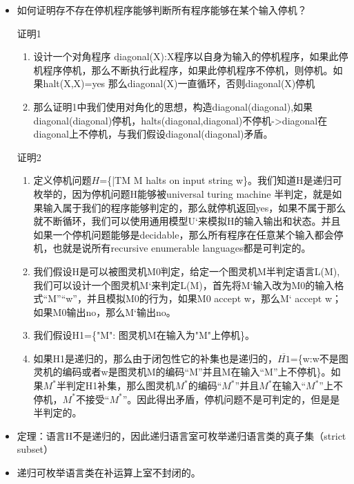 \documentclass[UTF8]{ctexart}
\begin{document}
\begin{itemize}
    \item 如何证明存不存在停机程序能够判断所有程序能够在某个输入停机？
    
    证明1
    \begin{enumerate}
        \item 设计一个对角程序 diagonal(X):X程序以自身为输入的停机程序，如果此停机程序停机，那么不断执行此程序，如果此停机程序不停机，则停机。如果halt(X,X)=yes 那么diagonal(X)一直循环，否则diagonal(X)停机
        \item 那么证明1中我们使用对角化的思想，构造diagonal(diagonal),如果diagonal(diagonal)停机，halts(diagonal,diagonal)不停机->diagonal在diagonal上不停机，与我们假设diagonal(diagonal)矛盾。
    \end{enumerate}

    证明2
    \begin{enumerate}
        \item 定义停机问题$H$=\{<M,w>|TM M halts on input string w\}。我们知道H是递归可枚举的，因为停机问题H能够被universal turing machine 半判定，就是如果输入属于我们的程序能够判定的，那么就停机返回yes，如果不属于那么就不断循环，我们可以使用通用模型U‘来模拟H的输入输出和状态。并且如果一个停机问题能够是decidable，那么所有程序在任意某个输入都会停机，也就是说所有recursive enumerable languages都是可判定的。
        \item 我们假设H是可以被图灵机M0判定，给定一个图灵机M半判定语言L(M),我们可以设计一个图灵机M‘来判定L(M)，首先将M‘输入改为M0的输入格式“M”“w”，并且模拟M0的行为，如果M0 accept w，那么M‘ accept w；如果M0输出no，那么M‘输出no。
        \item 我们假设H1=\{"M": 图灵机M在输入为"M"上停机\}。
        \item 如果H1是递归的，那么由于闭包性它的补集也是递归的，$\overline{H1}$=\{w:w不是图灵机的编码或者w是图灵机M的编码“M”并且M在输入“M”上不停机\}。如果$M^{*}$半判定H1补集，那么图灵机$M^{*}$的编码“$M^{*}$”并且$M^{*}$在输入“$M^{*}$”上不停机，$M^{*}$不接受“$M^{*}$”。因此得出矛盾，停机问题不是可判定的，但是是半判定的。
    \end{enumerate}

    \item 定理：语言H不是递归的，因此递归语言室可枚举递归语言类的真子集（strict subset）
    
    \item 递归可枚举语言类在补运算上室不封闭的。


\end{itemize}
\end{document}
